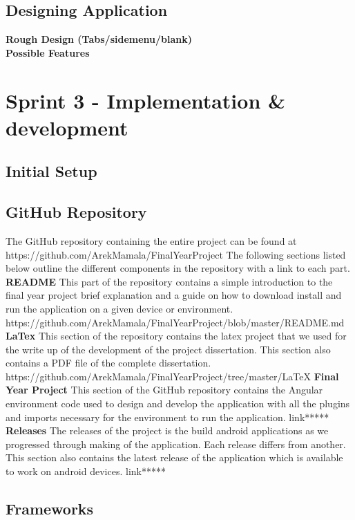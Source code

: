\documentclass[a4paper,12pt]{report}
\begin{document}
\subsection{Designing Application}
\textbf{Rough Design (Tabs/sidemenu/blank)}\\
\textbf{Possible Features}\\

\section{Sprint 3 - Implementation \& development}
\subsection{Initial Setup}

\subsection{GitHub Repository}
The GitHub repository containing the entire project can be found at 
https://github.com/ArekMamala/FinalYearProject
The following sections listed below outline the different components in the repository with a link to each part.
\textbf{README}
This part of the repository contains a simple introduction to the final year project brief explanation and a guide on how to download  install and run the application on a given device or environment.
https://github.com/ArekMamala/FinalYearProject/blob/master/README.md
\textbf{LaTex}
This section of the repository contains the latex project that we used for the write up of the development of the project dissertation. This section also contains a PDF file of the complete dissertation.  
https://github.com/ArekMamala/FinalYearProject/tree/master/LaTeX
\textbf{Final Year Project}
This section of the GitHub repository contains the Angular environment code used to design and develop the application with all the plugins and imports necessary for the environment to run the application. 
link*****
\textbf{Releases}
The releases of the project is the build android applications as we progressed through making of the application. Each release differs from another. This section also contains the latest release of the application which is available to work on android devices. 
link*****

\subsection{Frameworks}
\end{document}
